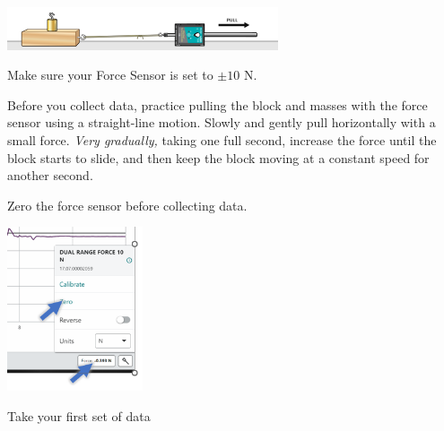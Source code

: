 \documentclass[10pt]{exam}
\begin{document}
\includegraphics[width=8cm]{friction-lab.PNG}

\begin{questions}
  \question
    Make sure your Force Sensor is set to $\pm 10$ N.

  \question 
    Before you collect data, practice pulling the block and masses with the force sensor using a straight-line motion. Slowly and gently pull horizontally with a small force. \emph{Very gradually,} taking one full second, increase the force until the block starts to slide, and then keep the block moving at a constant speed for another second.




  \question 
    Zero the force sensor before collecting data.

    \begin{minipage}[b]{10cm}
      \vspace{6em}
    \end{minipage}
    \hfill
    \includegraphics[width=4cm]{zero}
      


  \question
    Take your first set of data
  
    \begin{parts}

\end{parts}
\end{questions}
\end{document}
